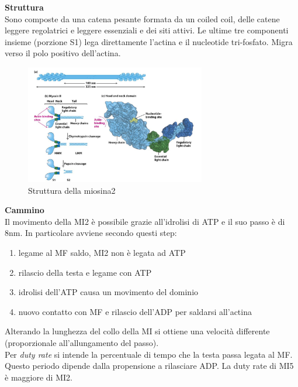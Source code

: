             \textbf{Struttura}\\
            Sono composte da una catena pesante formata da un coiled coil, delle catene leggere regolatrici e leggere essenziali e dei siti attivi. Le ultime tre componenti insieme (porzione S1) lega direttamente l'actina e il nucleotide tri-fosfato. Migra verso il polo positivo dell'actina.\\
            \begin{figure}[h]
                \centering
                \includegraphics[width=0.7\textwidth]{images/miosina.JPG}
                \caption{\small Struttura della miosina2}
                \label{fig:mesh1}
            \end{figure}
            
            \textbf{Cammino}\\
                Il movimento della MI2 è possibile grazie all'idrolisi di ATP e il suo passo è di 8nm. 
                In particolare avviene secondo questi step:
                \begin{enumerate}
                    \item legame al MF saldo, MI2 non è legata ad ATP
                    \item rilascio della testa e legame con ATP
                    \item idrolisi dell'ATP causa un movimento del dominio
                    \item nuovo contatto con MF e rilascio dell'ADP per saldarsi all'actina
                \end{enumerate}
                Alterando la lunghezza del collo della MI si ottiene una velocità differente (proporzionale all'allungamento del passo). \\
                Per \textit{duty rate} si intende la percentuale di tempo che la testa passa legata al MF. Questo periodo dipende dalla propensione a rilasciare ADP. La duty rate di MI5 è maggiore di MI2. \\
            
